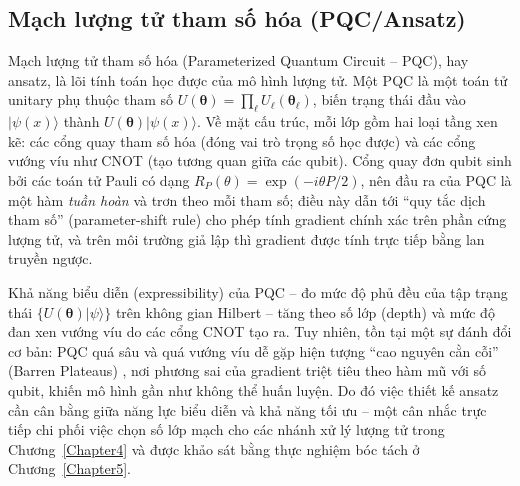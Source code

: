 \subsection{Mạch lượng tử tham số hóa (PQC/Ansatz)}
Mạch lượng tử tham số hóa (Parameterized Quantum Circuit -- PQC), hay ansatz, là lõi tính toán học được của mô hình lượng tử. Một PQC là một toán tử unitary phụ thuộc tham số $U(\boldsymbol{\theta})=\prod_{\ell} U_{\ell}(\boldsymbol{\theta}_{\ell})$, biến trạng thái đầu vào $|\psi(x)\rangle$ thành $U(\boldsymbol{\theta})|\psi(x)\rangle$. Về mặt cấu trúc, mỗi lớp gồm hai loại tầng xen kẽ: các cổng quay tham số hóa (đóng vai trò trọng số học được) và các cổng vướng víu như CNOT (tạo tương quan giữa các qubit). Cổng quay đơn qubit sinh bởi các toán tử Pauli có dạng $R_{P}(\theta)=\exp(-i\theta P/2)$, nên đầu ra của PQC là một hàm \emph{tuần hoàn} và trơn theo mỗi tham số; điều này dẫn tới ``quy tắc dịch tham số'' (parameter-shift rule) cho phép tính gradient chính xác trên phần cứng lượng tử, và trên môi trường giả lập thì gradient được tính trực tiếp bằng lan truyền ngược.

Khả năng biểu diễn (expressibility) của PQC -- đo mức độ phủ đều của tập trạng thái $\{U(\boldsymbol{\theta})|\psi\rangle\}$ trên không gian Hilbert -- tăng theo số lớp (depth) và mức độ đan xen vướng víu do các cổng CNOT tạo ra. Tuy nhiên, tồn tại một sự đánh đổi cơ bản: PQC quá sâu và quá vướng víu dễ gặp hiện tượng ``cao nguyên cằn cỗi'' (Barren Plateaus) \cite{mcclean2018barren}, nơi phương sai của gradient triệt tiêu theo hàm mũ với số qubit, khiến mô hình gần như không thể huấn luyện. Do đó việc thiết kế ansatz cần cân bằng giữa năng lực biểu diễn và khả năng tối ưu -- một cân nhắc trực tiếp chi phối việc chọn số lớp mạch cho các nhánh xử lý lượng tử trong Chương~\ref{Chapter4} và được khảo sát bằng thực nghiệm bóc tách ở Chương~\ref{Chapter5}.

